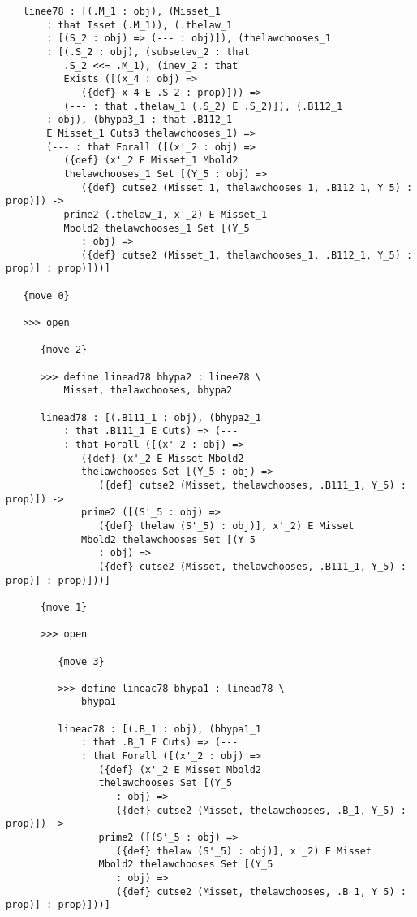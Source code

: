 \documentclass[12pt]{article}
\begin{document}
\begin{verbatim}
   linee78 : [(.M_1 : obj), (Misset_1 
       : that Isset (.M_1)), (.thelaw_1 
       : [(S_2 : obj) => (--- : obj)]), (thelawchooses_1 
       : [(.S_2 : obj), (subsetev_2 : that 
          .S_2 <<= .M_1), (inev_2 : that 
          Exists ([(x_4 : obj) => 
             ({def} x_4 E .S_2 : prop)])) => 
          (--- : that .thelaw_1 (.S_2) E .S_2)]), (.B112_1 
       : obj), (bhypa3_1 : that .B112_1 
       E Misset_1 Cuts3 thelawchooses_1) => 
       (--- : that Forall ([(x'_2 : obj) => 
          ({def} (x'_2 E Misset_1 Mbold2 
          thelawchooses_1 Set [(Y_5 : obj) => 
             ({def} cutse2 (Misset_1, thelawchooses_1, .B112_1, Y_5) : prop)]) -> 
          prime2 (.thelaw_1, x'_2) E Misset_1 
          Mbold2 thelawchooses_1 Set [(Y_5 
             : obj) => 
             ({def} cutse2 (Misset_1, thelawchooses_1, .B112_1, Y_5) : prop)] : prop)]))]

   {move 0}

   >>> open

      {move 2}

      >>> define linead78 bhypa2 : linee78 \
          Misset, thelawchooses, bhypa2

      linead78 : [(.B111_1 : obj), (bhypa2_1 
          : that .B111_1 E Cuts) => (--- 
          : that Forall ([(x'_2 : obj) => 
             ({def} (x'_2 E Misset Mbold2 
             thelawchooses Set [(Y_5 : obj) => 
                ({def} cutse2 (Misset, thelawchooses, .B111_1, Y_5) : prop)]) -> 
             prime2 ([(S'_5 : obj) => 
                ({def} thelaw (S'_5) : obj)], x'_2) E Misset 
             Mbold2 thelawchooses Set [(Y_5 
                : obj) => 
                ({def} cutse2 (Misset, thelawchooses, .B111_1, Y_5) : prop)] : prop)]))]

      {move 1}

      >>> open

         {move 3}

         >>> define lineac78 bhypa1 : linead78 \
             bhypa1

         lineac78 : [(.B_1 : obj), (bhypa1_1 
             : that .B_1 E Cuts) => (--- 
             : that Forall ([(x'_2 : obj) => 
                ({def} (x'_2 E Misset Mbold2 
                thelawchooses Set [(Y_5 
                   : obj) => 
                   ({def} cutse2 (Misset, thelawchooses, .B_1, Y_5) : prop)]) -> 
                prime2 ([(S'_5 : obj) => 
                   ({def} thelaw (S'_5) : obj)], x'_2) E Misset 
                Mbold2 thelawchooses Set [(Y_5 
                   : obj) => 
                   ({def} cutse2 (Misset, thelawchooses, .B_1, Y_5) : prop)] : prop)]))]


\end{verbatim}
\end{document}
